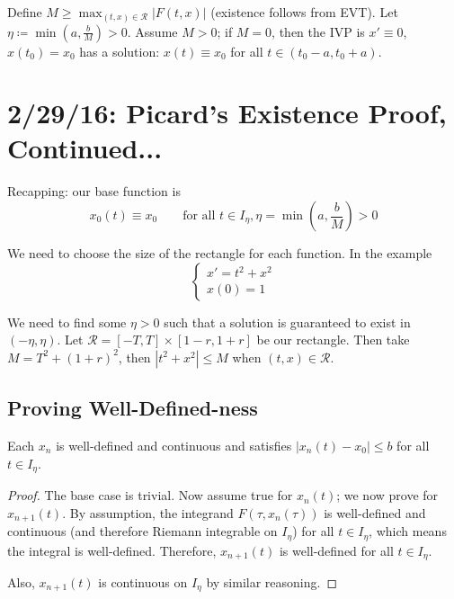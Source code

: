 \documentclass[12pt]{article}
\begin{document}
Define $M \ge \displaystyle\max_{(t,x) \in \mathcal{R}}|F(t,x)|$ (existence follows from EVT). Let $\eta \coloneqq \min(a,\frac{b}{M}) > 0$. Assume $M>0$; if $M=0$, then the IVP is $x' \equiv 0$, $x(t_0) = x_0$ has a solution: $x(t) \equiv x_0$ for all $t \in (t_0 - a,t_0 + a)$.

\section{2/29/16: Picard's Existence Proof, Continued...}
Recapping: our base function is \[ x_0(t) \equiv x_0 \qquad \text{for all } t \in I_{\eta}, \eta = \min\left(a,\frac{b}{M}\right) >0 \]

We need to choose the size of the rectangle for each function. In the example 
\[
\begin{cases}
x' = t^2 + x^2 \\
x(0) = 1
\end{cases}
\]

We need to find some $\eta > 0$ such that a solution is guaranteed to exist in $(-\eta,\eta)$. Let $\mathcal{R} = [-T,T] \times [1-r,1+r]$ be our rectangle. Then take $M = T^2 + (1+r)^2$, then $|t^2 + x^2| \le M$ when $(t,x) \in \mathcal{R}$.

\subsection{Proving Well-Defined-ness}
\begin{theorem}
Each $x_n$ is well-defined and continuous and satisfies $|x_n(t) - x_0| \le b$ for all $t \in I_{\eta}$.
\end{theorem}
\begin{proof}
The base case is trivial. Now assume true for $x_n(t)$; we now prove for $x_{n+1}(t)$. By assumption, the integrand $F(\tau,x_n(\tau))$ is well-defined and continuous (and therefore Riemann integrable on $I_{\eta}$) for all $t \in I_{\eta}$, which means the integral is well-defined. Therefore, $x_{n+1}(t)$ is well-defined for all $t \in I_{\eta}$.

Also, $x_{n+1}(t)$ is continuous on $I_{\eta}$ by similar reasoning. 
\end{proof}
\end{document}
